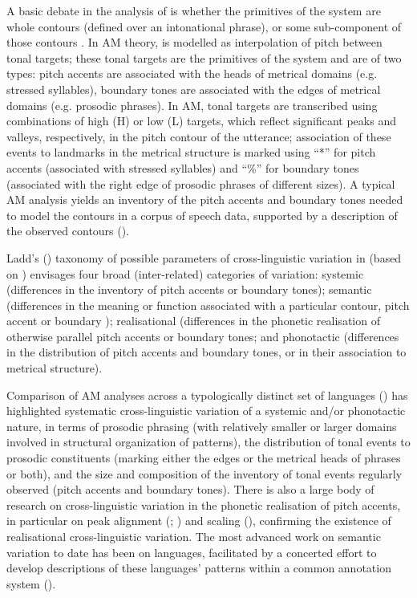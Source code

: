 \documentclass[output=paper]{langsci/langscibook}
\begin{document}
A basic debate in the analysis of  is whether the primitives of the system are whole contours (defined over an intonational phrase), or some sub-component of those contours \citep{Ladd2008}. In AM theory,  is modelled as interpolation of pitch between tonal targets; these tonal targets are the primitives of the system and are of two types: pitch accents are associated with the heads of metrical domains (e.g. stressed syllables), boundary tones are associated with the edges of metrical domains (e.g. prosodic phrases). In AM, tonal targets are transcribed using combinations of high (H) or low (L) targets, which reflect significant peaks and valleys, respectively, in the pitch contour of the utterance; association of these events to landmarks in the metrical structure is marked using ``*'' for pitch accents (associated with stressed syllables) and ``\%'' for boundary tones (associated with the right edge of prosodic phrases of different sizes). A typical AM analysis yields an inventory of the pitch accents and boundary tones needed to model the contours in a corpus of speech data, supported by a description of the observed contours (\citealt{JunFletcher2015}).

Ladd's (\citeyear{Ladd2008}) taxonomy of possible parameters of cross-linguistic variation in  (based on \citealt{Wells1982}) envisages four broad (inter-related) categories of variation: systemic (differences in the inventory of pitch accents or boundary tones); semantic (differences in the meaning or function associated with a particular contour, pitch accent or boundary ); realisational (differences in the phonetic realisation of otherwise parallel pitch accents or boundary tones; and phonotactic (differences in the distribution of pitch accents and boundary tones, or in their association to metrical structure). 

Comparison of AM analyses across a typologically distinct set of languages (\citealt{Jun2005,Jun2015}) has highlighted systematic cross-linguistic variation of a systemic and/or phonotactic nature, in terms of prosodic phrasing (with relatively smaller or larger domains involved in structural organization of  patterns), the distribution of tonal events  to prosodic constituents (marking either the edges or the metrical heads of phrases or both), and the size and composition of the inventory of tonal events regularly observed (pitch accents and boundary tones). There is also a large body of research on cross-linguistic variation in the phonetic realisation of pitch accents, in particular on peak alignment (\citealt{AttererLadd2004}; \citealt{Ladd2006}) and scaling (\citealt{LaddMorton1997}), confirming the existence of realisational cross-linguistic variation. The most advanced work on semantic variation to date has been on  languages, facilitated by a concerted effort to develop descriptions of these languages'  patterns within a common annotation system (\citealt{FrotaPrieto2015}). 
\end{document}

